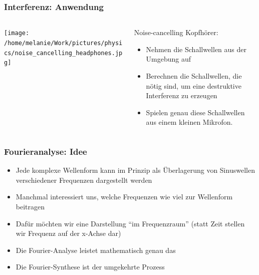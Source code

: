 \documentclass{beamer}
\begin{document}
\begin{frame}
\end{frame}

\begin{frame}
\end{frame}


\begin{frame}
\frametitle{Interferenz: Anwendung}

\begin{columns}[c]

\begin{column}{5cm}
\begin{center}
\texttt{[image: /home/melanie/Work/pictures/physics/noise\_cancelling\_headphones.jpg]}
\end{center}
\end{column}

\begin{column}{5cm}

\begin{block}{Noise-cancelling Kopfhörer:}

\begin{itemize}
\item 
Nehmen die Schallwellen aus der Umgebung auf 
\item
Berechnen die Schallwellen, die nötig sind, um eine destruktive Interferenz zu erzeugen
\item
Spielen genau diese Schallwellen aus einem kleinen Mikrofon.
\end{itemize}


\end{block}

\end{column}


\end{columns}

\end{frame}



\begin{frame}
\frametitle{Fourieranalyse: Idee}


\begin{itemize}
\item
Jede komplexe Wellenform kann im Prinzip als Überlagerung von Sinuswellen verschiedener Frequenzen dargestellt werden
\item
Manchmal interessiert uns, welche Frequenzen wie viel zur Wellenform beitragen
\item
Dafür möchten wir eine Darstellung ``im Frequenzraum'' (statt Zeit stellen wir Frequenz auf der x-Achse dar)
\item
Die Fourier-Analyse leistet mathematisch genau das  
\item
Die Fourier-Synthese ist der umgekehrte Prozess
\end{itemize}


\end{frame}
\end{document}
